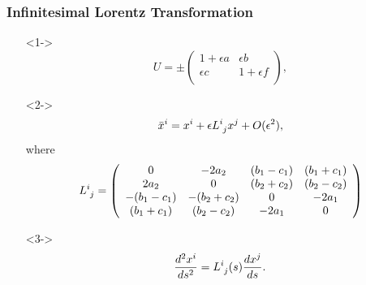 \documentclass[10pt,a4paper]{beamer}
\begin{document}
\begin{frame}
\frametitle{Infinitesimal Lorentz Transformation}
\begin{itemize}
\item[]<1->{
\begin{equation*}
U = \pm
\left(
\begin{array}{cc}
1 + \epsilon a & \epsilon b \\
\epsilon c & 1 + \epsilon f \\
\end{array}
\right),
\end{equation*}}
\item[]<2->{$$\bar{x}^i = x^i + \epsilon \tensor{L}{^{i}_{j}} x^j + O(\epsilon^2),$$
where 
\begin{equation*}
\tensor{L}{^i_j} = 
\left(
\begin{array}{cccc}
0            & -2a_2        & (b_1 - c_1) & (b_1+c_1)\\
2a_2         & 0            & (b_2+c_2)   & (b_2 - c_2) \\
-(b_1 - c_1) & -(b_2 + c_2) & 0           & -2a_1 \\
(b_1 + c_1)  & (b_2-c_2)    & -2a_1       & 0 \\
\end{array}
\right)
\end{equation*}}
\item[]<3->{
\begin{equation*}
\frac{d^2 x^i}{ds^2} = \tensor{L}{^{i}_{j}}(s) \frac{d x^j}{ds}.
\end{equation*}}
\end{itemize}

\end{frame}
\end{document}
